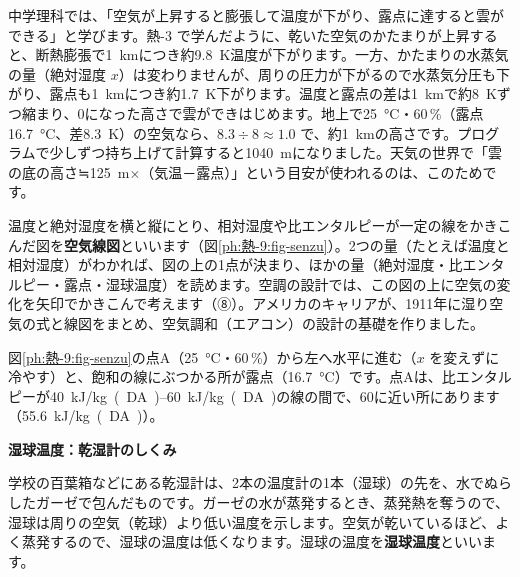\begin{motto}[3]
\label{ph:熱-9:kumo}中学理科では、「空気が上昇すると膨張して温度が下がり、露点に達すると雲ができる」と学びます。熱-3 で学んだように、乾いた空気のかたまりが上昇すると、断熱膨張で\qty{1}{km}につき約\qty{9.8}{K}温度が下がります。一方、かたまりの水蒸気の量（絶対湿度 $x$）は変わりませんが、周りの圧力が下がるので水蒸気分圧も下がり、露点も\qty{1}{km}につき約\qty{1.7}{K}下がります。温度と露点の差は\qty{1}{km}で約\qty{8}{K}ずつ縮まり、0になった高さで雲ができはじめます。地上で\qty{25}{\celsius}・60\,\%（露点\qty{16.7}{\celsius}、差\qty{8.3}{K}）の空気なら、$8.3\div8\approx1.0$ で、約\qty{1}{km}の高さです。プログラムで少しずつ持ち上げて計算すると\qty{1040}{m}になりました。天気の世界で「雲の底の高さ≒\qty{125}{m}×（気温－露点）」という目安が使われるのは、このためです。
\end{motto}


\leavevmode\label{ph:熱-9:sec7}温度と絶対湿度を横と縦にとり、相対湿度や比エンタルピーが一定の線をかきこんだ図を\textbf{空気線図}といいます（図\ref{ph:熱-9:fig-senzu}）。2つの量（たとえば温度と相対湿度）がわかれば、図の上の1点が決まり、ほかの量（絶対湿度・比エンタルピー・露点・湿球温度）を読めます。空調の設計では、この図の上に空気の変化を矢印でかきこんで考えます（⑧）。アメリカのキャリアが、1911年に湿り空気の式と線図をまとめ、空気調和（エアコン）の設計の基礎を作りました。

図\ref{ph:熱-9:fig-senzu}の点A（\qty{25}{\celsius}・60\,\%）から左へ水平に進む（$x$ を変えずに冷やす）と、飽和の線にぶつかる所が露点（\qty{16.7}{\celsius}）です。点Aは、比エンタルピーが\qtyrange{40}{60}{kJ/kg(DA)}の線の間で、60に近い所にあります（\qty{55.6}{kJ/kg(DA)}）。

\noindent\textbf{湿球温度：乾湿計のしくみ}\par\nobreak
学校の百葉箱などにある乾湿計は、2本の温度計の1本（湿球）の先を、水でぬらしたガーゼで包んだものです。ガーゼの水が蒸発するとき、蒸発熱を奪うので、湿球は周りの空気（乾球）より低い温度を示します。空気が乾いているほど、よく蒸発するので、湿球の温度は低くなります。湿球の温度を\textbf{湿球温度}といいます。

